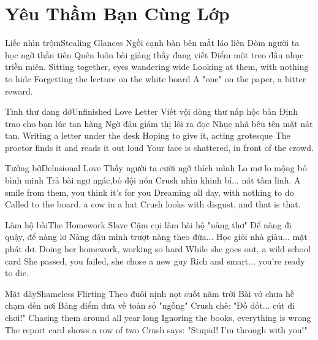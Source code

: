 \chapter{Yêu Thầm Bạn Cùng Lớp}

\begin{tutuyetbox}{Liếc nhìn trộm}{Stealing Glances}
Ngồi cạnh bàn bên mắt láo liên
Dòm người ta học ngỡ thần tiên
Quên luôn bài giảng thầy đang viết
Điểm một treo đầu nhục triền miên.
\tcblower
Sitting together, eyes wandering wide 
Looking at them, with nothing to hide 
Forgetting the lecture on the white board 
A "one" on the paper, a bitter reward.
\end{tutuyetbox}

\begin{tutuyetbox}{Tình thư dang dở}{Unfinished Love Letter}
Viết vội dòng thư nấp hộc bàn
Định trao cho bạn lúc tan hàng
Ngờ đâu giám thị lôi ra đọc
Nhục nhã bêu tên mặt nát tan.
\tcblower
Writing a letter under the desk 
Hoping to give it, acting grotesque 
The proctor finds it and reads it out loud 
Your face is shattered, in front of the crowd.
\end{tutuyetbox}

\begin{tutuyetbox}{Tưởng bở}{Delusional Love}
Thấy người ta cười ngỡ thích mình
Lo mơ lo mộng bỏ bình minh
Trả bài ngơ ngác,bò đội nón
Crush nhìn khinh bỉ... nát tâm linh.
\tcblower
A smile from them, you think it's for you 
Dreaming all day, with nothing to do 
Called to the board, a cow in a hat 
Crush looks with disgust, and that is that.
\end{tutuyetbox}

\begin{tutuyetbox}{Làm hộ bài}{The Homework Slave}
Cặm cụi làm bài hộ "nàng thơ"
Để nàng đi quậy, để nàng lơ
Nàng đậu mình trượt nàng theo đứa...
Học giỏi nhà giàu... mặt phát dơ.
\tcblower
Doing her homework, working so hard 
While she goes out, a wild school card 
She passed, you failed, she chose a new guy 
Rich and smart... you're ready to die.
\end{tutuyetbox}

\begin{tutuyetbox}{Mặt dày}{Shameless Flirting}
Theo đuôi nịnh nọt suốt năm trời
Bài vở chưa hề chạm đến nơi
Bảng điểm đưa về toàn số "ngỗng"
Crush chê: "Đồ dốt... cút đi chơi!"
\tcblower
Chasing them around all year long 
Ignoring the books, everything is wrong 
The report card shows a row of two 
Crush says: "Stupid! I'm through with you!"
\end{tutuyetbox}


